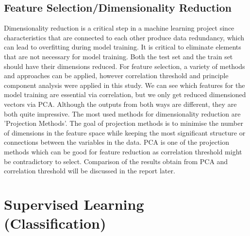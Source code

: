 \documentclass[12pt]{article}
\begin{document}
\subsection{Feature Selection/Dimensionality Reduction}
Dimensionality reduction is a critical step in a machine learning project since characteristics that are connected to each other produce data redundancy, which can lead to overfitting during model training. It is critical to eliminate elements that are not necessary for model training. Both the test set and the train set should have their dimensions reduced. For feature selection, a variety of methods and approaches can be applied, however correlation threshold and principle component analysis were applied in this study. We can see which features for the model training are essential via correlation, but we only get reduced dimensioned vectors via PCA. Although the outputs from both ways are different, they are both quite impressive. The most used methods for dimensionality reduction are 'Projection Methods'. The goal of projection methods is to minimise the number of dimensions in the feature space while keeping the most significant structure or connections between the variables in the data. PCA is one of the projection methods which can be good for feature reduction as correlation threshold might be contradictory to select. Comparison of the results obtain from PCA and correlation threshold will be discussed in the report later.


\section{Supervised Learning (Classification)}
\end{document}

